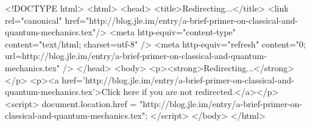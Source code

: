 <!DOCTYPE html>
<html>
<head>
<title>Redirecting...</title>
<link rel="canonical" href="http://blog.jle.im/entry/a-brief-primer-on-classical-and-quantum-mechanics.tex"/>
<meta http-equiv="content-type" content="text/html; charset=utf-8" />
<meta http-equiv="refresh" content="0; url=http://blog.jle.im/entry/a-brief-primer-on-classical-and-quantum-mechanics.tex" />
</head>
<body>
  <p><strong>Redirecting...</strong></p>
  <p><a href='http://blog.jle.im/entry/a-brief-primer-on-classical-and-quantum-mechanics.tex'>Click here if you are not redirected.</a></p>
  <script>
    document.location.href = "http://blog.jle.im/entry/a-brief-primer-on-classical-and-quantum-mechanics.tex";
  </script>
</body>
</html>
